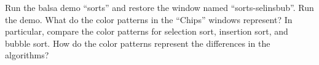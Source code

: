 Run the balsa demo ``sorts'' and restore the window named
``sorts-selinsbub''. Run the demo. What do the color patterns in
the ``Chips'' windows represent? In particular, compare the color
patterns for selection sort, insertion sort, and bubble sort. How
do the color patterns represent the differences in the algorithms?
